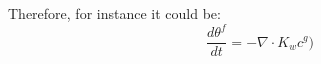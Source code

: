 Therefore, for instance it could be:
\begin{equation}
\frac{d \theta^f}{dt} = - {\nabla}\cdot  K_w c^g)
\end{equation}